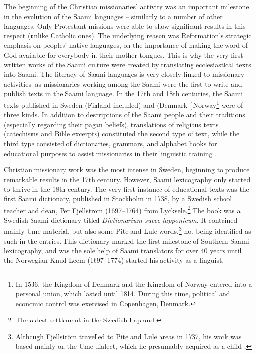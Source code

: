 \documentclass[output=paper,colorlinks,citecolor=brown,arabicfont,chinesefont]{langscibook}
\begin{document}
The beginning of the Christian missionaries’ activity was an important milestone in the evolution of the Saami languages – similarly to a number of other languages. Only Protestant missions were able to show significant results in this respect (unlike Catholic ones). The underlying reason was Reformation’s strategic emphasis on peoples’ native languages, on the importance of making the word of God available for everybody in their mother tongues. This is why the very first written works of the Saami culture were created by translating ecclesiastical texts into Saami. The literacy of Saami languages is very closely linked to missionary activities, as missionaries working among the Saami were the first to write and publish texts in the Saami language. In the 17th and 18th centuries, the Saami texts published in Sweden (Finland included) and (Denmark–)Norway\footnote{In 1536,  the Kingdom of Denmark and the Kingdom of Norway entered into a personal union, which lasted until 1814. During this time, political and economic control was exercised in Copenhagen, Denmark.} were of three kinds. In addition to descriptions of the Saami people and their traditions (especially regarding their pagan beliefs), translations of religious texts (catechisms and Bible excerpts) constituted the second type of text, while the third type consisted of dictionaries, grammars, and alphabet books for educational purposes to assist missionaries in their linguistic training \citep[8]{Aspaas2021}.

Christian missionary work was the most intense in Sweden, beginning to produce remarkable results in the 17th century. However, Saami lexicography only started to thrive in the 18th century. The very first instance of educational texts was the first Saami dictionary, published in Stockholm in 1738, by a Swedish school teacher and dean, Per Fjellström (1697--1764) from Lycksele.\footnote{The oldest settlement in the Swedish Lapland.} The book was a Swedish-Saami dictionary titled \emph{Dictionarium sueco-lapponicum}. It contained mainly Ume material, but also some Pite and Lule words,\footnote{Although Fjellström travelled to Pite and Lule areas in 1737, his work was based mainly on the Ume dialect, which he presumably acquired as a child \citep[154]{Toth2015}.} not being identified as such in the entries. This dictionary marked the first milestone of Southern Saami lexicography, and was the sole help of Saami translators for over 40 years until the Norwegian Knud Leem (1697–1774) started his activity as a linguist.
\end{document}
